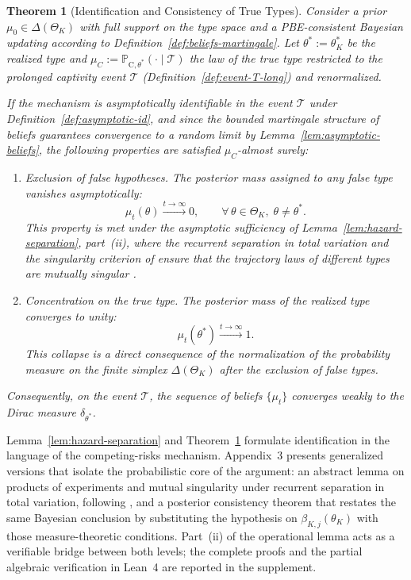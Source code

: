\documentclass[ecta,nameyear,draft]{econsocart}
\theoremstyle{plain}
\newtheorem{theorem}{Theorem}
\theoremstyle{definition}
\newcommand{\ProbC}[1]{\mathbb{P}_{\mathrm{C},#1}}
\newcommand{\ThetaK}{\Theta_K}
\newcommand{\1}{\mathbf{1}}
\begin{document}
\begin{theorem}[Identification and Consistency of True Types]\label{thm:posterior-consistency}
\normalfont
Consider a prior $\mu_0\in\Delta(\ThetaK)$ with full support on the type space and a PBE-consistent Bayesian updating according to Definition~\ref{def:beliefs-martingale}. Let $\theta^\ast:=\theta_K^\ast$ be the realized type and $\mu_C:=\ProbC{\theta^\ast}(\cdot\mid\mathcal{T})$ the law of the true type restricted to the prolonged captivity event $\mathcal{T}$ \textup{(}Definition~\ref{def:event-T-long}\textup{)} and renormalized.

If the mechanism is asymptotically identifiable in the event $\mathcal{T}$ under Definition~\ref{def:asymptotic-id}, and since the bounded martingale structure of beliefs guarantees convergence to a random limit by Lemma~\ref{lem:asymptotic-beliefs}, the following properties are satisfied $\mu_C$-almost surely:
\begin{enumerate}
  \item Exclusion of false hypotheses. The posterior mass assigned to any false type vanishes asymptotically:
  \begin{equation*}
  \mu_t(\theta)\xrightarrow{t\to\infty}0,\qquad \forall\,\theta\in\ThetaK,\;\theta\neq\theta^\ast.
  \end{equation*}
  This property is met under the asymptotic sufficiency of Lemma~\ref{lem:hazard-separation}, part~\textup{(ii)}, where the recurrent separation in total variation and the singularity criterion of \citet{Kakutani1948} ensure that the trajectory laws of different types are mutually singular \citet{Shiryaev2019Probability}.

  \item Concentration on the true type. The posterior mass of the realized type converges to unity:
  \begin{equation*}
  \mu_t(\theta^\ast)\xrightarrow{t\to\infty}1.
  \end{equation*}
  This collapse is a direct consequence of the normalization of the probability measure on the finite simplex $\Delta(\ThetaK)$ after the exclusion of false types.
\end{enumerate}
Consequently, on the event $\mathcal{T}$, the sequence of beliefs $\{\mu_t\}$ converges weakly to the Dirac measure $\delta_{\theta^\ast}$.
\end{theorem}

Lemma~\ref{lem:hazard-separation} and Theorem~\ref{thm:posterior-consistency} formulate identification in the language of the competing-risks mechanism. Appendix~3 presents generalized versions that isolate the probabilistic core of the argument: an abstract lemma on products of experiments and mutual singularity under recurrent separation in total variation, following \citet{Kakutani1948}, and a posterior consistency theorem that restates the same Bayesian conclusion by substituting the hypothesis on $\beta_{K,j}(\theta_K)$ with those measure-theoretic conditions. Part~\textup{(ii)} of the operational lemma acts as a verifiable bridge between both levels; the complete proofs and the partial algebraic verification in Lean~4 are reported in the supplement.
\end{document}
